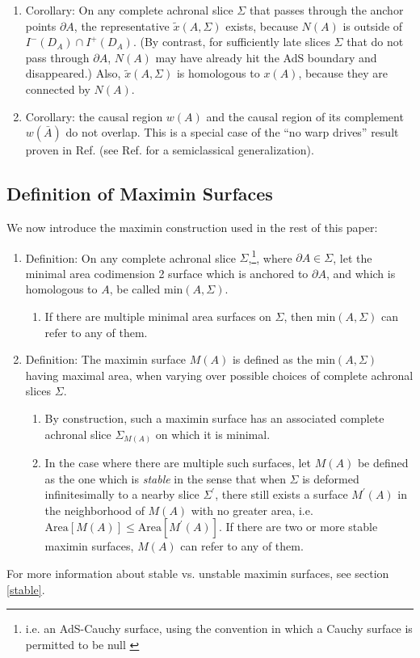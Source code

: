 \documentclass[12pt]{article}
\begin{document}
\begin{enumerate}[resume]
\begin{enumerate}
	\item \label{repex} Corollary: On any complete achronal slice $\Sigma$ that passes through the anchor points $\partial A$, the representative $\tilde{x}(A,\Sigma)$ exists, because $N(A)$ is outside of $I^-(D_A) \cap I^+(D_A)$.  (By contrast, for sufficiently late slices $\Sigma$ that do not pass through $\partial A$, $N(A)$ may have already hit the AdS boundary and disappeared.)  Also, $\tilde{x}(A,\Sigma)$ is homologous to $x(A)$, because they are connected by $N(A)$.
	\item Corollary: the causal region $w(A)$ and the causal region of its complement $w(\bar{A})$ do not overlap.  This is a special case of the ``no warp drives'' result proven in Ref. \cite{GW00} (see Ref. \cite{sing} for a semiclassical generalization).
	\end{enumerate}
\end{enumerate}

\subsection{Definition of Maximin Surfaces}\label{def}

We now introduce the maximin construction used in the rest of this paper:

\begin{enumerate}[resume]
\item Definition: On any complete achronal slice $\Sigma$,\footnote{i.e. an AdS-Cauchy surface, using the convention in which a Cauchy surface is permitted to be null \cite{geroch70}}, where $\partial A \in \Sigma$, let the minimal area codimension 2 surface which is anchored to $\partial A$, and which is homologous to $A$, be called $\mathrm{min}(A,\Sigma)$.
	\begin{enumerate}
	\item If there are multiple minimal area surfaces on $\Sigma$, then $\mathrm{min}(A,\Sigma)$ can refer to any of them.
	\end{enumerate}

\item \label{Mdef} Definition: The maximin surface $M(A)$ is defined as the $\mathrm{min}(A,\Sigma)$ having maximal area, when varying over possible choices of complete achronal slices $\Sigma$.
	\begin{enumerate}
	\item By construction, such a maximin surface has an associated complete achronal slice $\Sigma_{M(A)}$ on which it is minimal.
	\item \label{sdef} In the case where there are multiple such surfaces, let $M(A)$ be defined as the one which is \emph{stable} in the sense that when $\Sigma$ is deformed infinitesimally to a nearby slice $\Sigma^\prime$, there still exists a surface $M^\prime(A)$ in the neighborhood of $M(A)$ with no greater area, i.e. $\mathrm{Area}[M(A)] \le \mathrm{Area}[M^\prime(A)]$.  If there are two or more stable maximin surfaces, $M(A)$ can refer to any of them.
	\end{enumerate}
\end{enumerate}
For more information about stable vs. unstable maximin surfaces, see section \ref{stable}.
\end{document}
